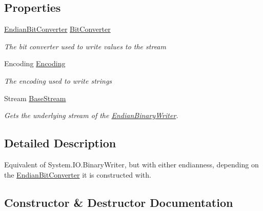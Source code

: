 \subsection*{Properties}
\begin{DoxyCompactItemize}
\item 
\mbox{\hyperlink{class_t_net_1_1_i_o_1_1_endian_bit_converter}{Endian\+Bit\+Converter}} \mbox{\hyperlink{class_t_net_1_1_i_o_1_1_endian_binary_writer_a8c822aded2ba7d9f2769f94a49d01c2e}{Bit\+Converter}}
\begin{DoxyCompactList}\small\item\em The bit converter used to write values to the stream \end{DoxyCompactList}\item 
Encoding \mbox{\hyperlink{class_t_net_1_1_i_o_1_1_endian_binary_writer_a0148eabc0f952c96b0a43d364c60c03b}{Encoding}}
\begin{DoxyCompactList}\small\item\em The encoding used to write strings \end{DoxyCompactList}\item 
Stream \mbox{\hyperlink{class_t_net_1_1_i_o_1_1_endian_binary_writer_a17f6eb3691c16b9c4ddfb9b2d1ef12d2}{Base\+Stream}}
\begin{DoxyCompactList}\small\item\em Gets the underlying stream of the \mbox{\hyperlink{class_t_net_1_1_i_o_1_1_endian_binary_writer}{Endian\+Binary\+Writer}}. \end{DoxyCompactList}\end{DoxyCompactItemize}


\subsection{Detailed Description}
Equivalent of System.\+I\+O.\+Binary\+Writer, but with either endianness, depending on the \mbox{\hyperlink{class_t_net_1_1_i_o_1_1_endian_bit_converter}{Endian\+Bit\+Converter}} it is constructed with. 



\subsection{Constructor \& Destructor Documentation}
\mbox{\label{class_t_net_1_1_i_o_1_1_endian_binary_writer_a3e6bc74a2340282fa8ca4d5613bb1012}} 
